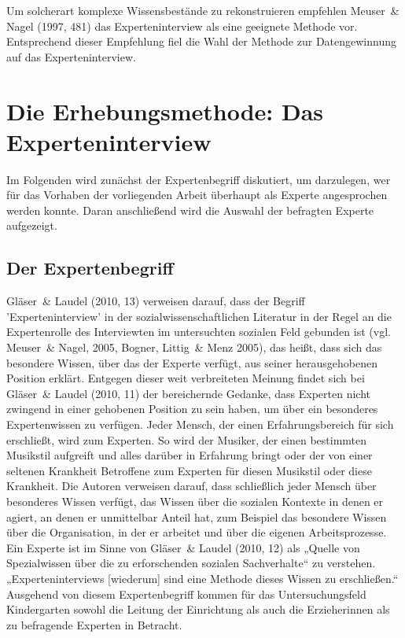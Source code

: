 Um solcherart komplexe Wissensbestände zu rekonstruieren empfehlen Meuser~\& Nagel (1997, 481) das Experteninterview als eine geeignete Methode vor. Entsprechend dieser Empfehlung fiel die Wahl der Methode zur Datengewinnung auf das Experteninterview. 


\section{Die Erhebungsmethode: Das Experteninterview}
Im Folgenden wird zunächst der Expertenbegriff diskutiert, um darzulegen, wer für das Vorhaben der vorliegenden Arbeit überhaupt als Experte angesprochen werden konnte.
Daran anschließend wird die Auswahl der befragten Experte aufgezeigt. 

\subsection{Der Expertenbegriff}
Gläser~\& Laudel (2010, 13) verweisen darauf, dass der Begriff ’Experteninterview’ in der sozialwissenschaftlichen Literatur in der Regel an die Expertenrolle des Interviewten im untersuchten sozialen Feld gebunden ist (vgl. Meuser~\& Nagel, 2005, Bogner, Littig~\& Menz 2005), das heißt, dass sich das besondere Wissen, über das der Experte verfügt, aus seiner herausgehobenen Position erklärt. Entgegen dieser weit verbreiteten Meinung findet sich bei Gläser~\& Laudel (2010, 11) der bereichernde Gedanke, dass Experten nicht zwingend in einer gehobenen Position zu sein haben, um über ein besonderes Expertenwissen zu verfügen. Jeder Mensch, der einen Erfahrungsbereich für sich erschließt, wird zum Experten. So wird der Musiker, der einen bestimmten Musikstil aufgreift und alles darüber in Erfahrung bringt oder der von einer seltenen Krankheit Betroffene zum Experten für diesen Musikstil oder diese Krankheit. Die Autoren verweisen darauf, dass schließlich jeder Mensch über besonderes Wissen verfügt, das Wissen über die sozialen Kontexte in denen er agiert, an denen er unmittelbar Anteil hat, zum Beispiel das besondere Wissen über die Organisation, in der er arbeitet und über die eigenen Arbeitsprozesse. Ein Experte ist im Sinne von Gläser~\& Laudel (2010, 12) als „Quelle von Spezialwissen über die zu erforschenden sozialen Sachverhalte“ zu verstehen. „Experteninterviews [wiederum] sind eine Methode dieses Wissen zu erschließen.“ Ausgehend von diesem Expertenbegriff kommen für das Untersuchungsfeld Kindergarten sowohl die Leitung der Einrichtung als auch die Erzieherinnen als zu befragende Experten in Betracht. 
 
